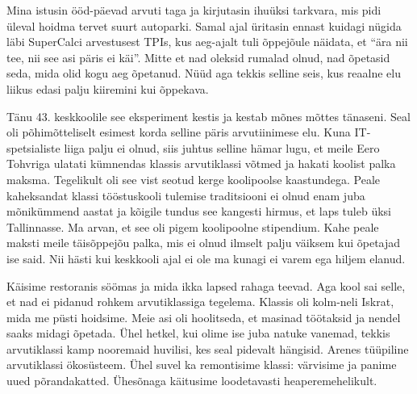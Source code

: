 Mina istusin ööd-päevad arvuti taga ja kirjutasin 
ihuüksi tarkvara, mis pidi 
üleval hoidma tervet suurt autoparki. Samal ajal üritasin ennast kuidagi nügida 
läbi SuperCalci arvestusest TPIs, 
kus 
aeg-ajalt tuli õppejõule näidata, et \enquote{ära nii tee, nii see asi päris ei 
käi}. 
Mitte et nad oleksid rumalad olnud, nad õpetasid seda, mida olid kogu 
aeg õpetanud. Nüüd aga tekkis selline seis, kus reaalne elu liikus edasi palju 
kiiremini kui õppekava.


Tänu 43. keskkoolile see eksperiment kestis ja kestab mõnes mõttes tänaseni. 
Seal oli 
põhimõtteliselt esimest korda selline päris arvutiinimese elu. Kuna 
IT-spetsialiste liiga palju ei olnud, siis juhtus selline hämar lugu, et meile 
Eero Tohvriga ulatati kümnendas klassis arvutiklassi 
võtmed ja hakati 
koolist palka maksma. Tegelikult oli see vist seotud 
kerge koolipoolse kaastundega. Peale 
kaheksandat klassi tööstuskooli tulemise traditsiooni ei olnud enam juba 
mõnikümmend aastat ja kõigile tundus see kangesti hirmus, et laps tuleb üksi 
Tallinnasse. Ma arvan, et see oli pigem koolipoolne stipendium. 
Kahe peale maksti meile täisõppejõu palka, mis 
ei olnud ilmselt palju väiksem kui õpetajad 
ise said. Nii hästi kui keskkooli ajal ei ole ma kunagi ei varem ega 
hiljem elanud. 


Käisime restoranis söömas ja mida ikka lapsed rahaga teevad. Aga kool sai 
selle, et nad ei pidanud rohkem arvutiklassiga tegelema. Klassis oli kolm-neli  
Iskrat, 
mida me püsti hoidsime. Meie asi 
oli hoolitseda, et masinad töötaksid ja nendel saaks midagi õpetada. Ühel
hetkel, kui olime ise juba natuke vanemad, tekkis arvutiklassi 
kamp nooremaid huvilisi, kes seal pidevalt hängisid. Arenes
tüüpiline arvutiklassi ökosüsteem. Ühel suvel ka remontisime 
klassi: värvisime ja panime uued põrandakatted. Ühesõnaga käitusime 
loodetavasti heaperemehelikult. 

